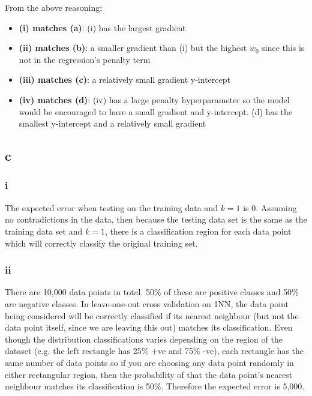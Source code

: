\documentclass{article}
\begin{document}
From the above reasoning:
\begin{itemize}
    \item \textbf{(i) matches (a)}: (i) has the largest gradient
    \item \textbf{(ii) matches (b)}: a smaller gradient than (i) but the highest \(w_{0}\) since this is not in the regression's penalty term
    \item \textbf{(iii) matches (c)}: a relatively small gradient y-intercept
    \item \textbf{(iv) matches (d)}: (iv) has a large penalty hyperparameter so the model would be encouraged to have a small gradient and y-intercept. (d) has the smallest y-intercept and a relatively small gradient
\end{itemize}

\subsection*{c}

\subsubsection*{i}

The expected error when testing on the training data and \(k = 1\) is 0. Assuming no contradictions in the data, then because the testing data set is 
the same as the training data set and \(k = 1\), there is a classification region for each data point which will correctly classify the original training set.

\subsubsection*{ii}

There are 10,000 data points in total. 50\% of these are positive classes and 50\% are negative classes. In leave-one-out cross validation on 1NN, the data point being considered will be correctly classified if its nearest neighbour 
(but not the data point itself, since we are leaving this out) matches its classification. Even though the distribution classifications varies depending on 
the region of the dataset (e.g. the left rectangle has 25\% +ve and 75\% -ve), each rectangle has the same number of data points so if you are choosing any data point randomly in either rectangular region,
then the probability of that the data point's nearest neighbour matches its classification is 50\%. Therefore the expected error is 5,000.
\end{document}
